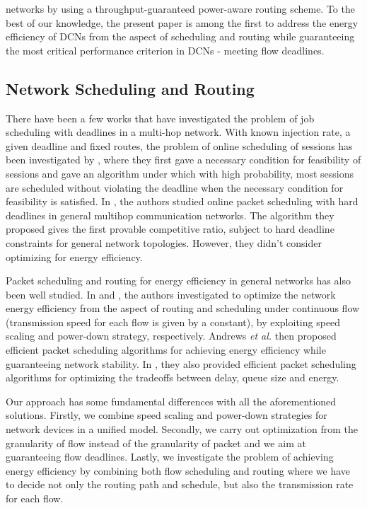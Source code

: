\documentclass[10pt, conference, compsocconf]{IEEEtran}
\begin{document}
networks by using a throughput-guaranteed power-aware routing scheme. To the best of our knowledge, the present paper is among the first to address the energy efficiency of DCNs from the aspect of scheduling and routing while guaranteeing the most critical performance criterion in DCNs - meeting flow deadlines. 

\subsection{Network Scheduling and Routing}

There have been a few works that have investigated the problem of job scheduling with deadlines in a multi-hop network. With known injection rate, a given deadline and fixed routes, the problem of online scheduling of sessions has been investigated by \cite{Andrews_Zhang-1999}, where they first gave a necessary condition for feasibility of sessions and gave an algorithm under which with high probability, most sessions are scheduled without violating the deadline when the necessary condition for feasibility is satisfied. In \cite{Mao_Koksal-2013}, the authors studied online packet scheduling with hard deadlines in general multihop communication networks. The algorithm they proposed gives the first provable competitive ratio, subject to hard deadline constraints for general network topologies. However, they didn't consider optimizing for energy efficiency.

Packet scheduling and routing for energy efficiency in general networks has also been well studied. In \cite{Andrews_Fernandez-SS-2010} and \cite{Andrews_Anta-pd}, the authors investigated to optimize the network energy efficiency from the aspect of routing and scheduling under continuous flow (transmission speed for each flow is given by a constant), by exploiting speed scaling and power-down strategy, respectively. Andrews \emph{et al.} \cite{Andrews_Antonakopoulos-2011} then proposed efficient packet scheduling algorithms for achieving energy efficiency while guaranteeing network stability. In \cite{Andrews_Zhang-2012}, they also provided efficient packet scheduling algorithms for optimizing the tradeoffs between delay, queue size and energy. 

Our approach has some fundamental differences with all the aforementioned solutions. Firstly, we combine speed scaling and power-down strategies for network devices in a unified model. Secondly, we carry out optimization from the granularity of flow instead of the granularity of packet and we aim at guaranteeing flow deadlines. Lastly, we investigate the problem of achieving energy efficiency by combining both flow scheduling and routing where we have to decide not only the routing path and schedule, but also the transmission rate for each flow. 
\end{document}
